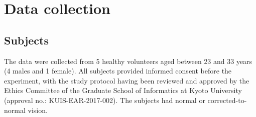 \section{Data collection}


\subsection{Subjects}
The data were collected from 5 healthy volunteers aged between 23 and 33 years (4 males and 1 female). All subjects provided informed consent before the experiment, with the study protocol having been reviewed and approved by the Ethics Committee of the Graduate School of Informatics at Kyoto University (approval no.: KUIS{-}EAR{-}2017{-}002). The subjects had normal or corrected-to-normal vision.


